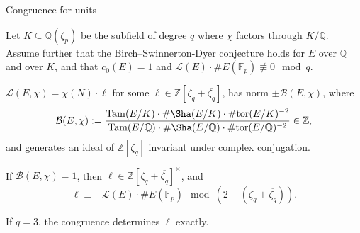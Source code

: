 \documentclass[10pt]{beamer}
\begin{document}
\begin{frame}[t]{Congruence for units}

Let $ K \subseteq \mathbb{Q}(\zeta_p) $ be the subfield of degree $ q $ where $ \chi $ factors through $ K / \mathbb{Q} $. \pause Assume further that the Birch--Swinnerton-Dyer conjecture holds for $ E $ over $ \mathbb{Q} $ and over $ K $, and that $ c_0(E) = 1 $ and $ \mathcal{L}(E) \cdot \#E(\mathbb{F}_p) \not\equiv 0 \mod q $.

\pause

\begin{theorem}
$ \mathcal{L}(E, \chi) = \overline{\chi}(N) \cdot \ell $ for some $ \ell \in \mathbb{Z}[\zeta_q + \overline{\zeta_q}] $, \pause has norm $ \pm\mathcal{B}(E, \chi) $, where
$$ \mathcal{B}(E, \chi) := \dfrac{\mathrm{Tam}(E / K) \cdot \#\Sha(E / K) \cdot \#\mathrm{tor}(E / K)^{-2}}{\mathrm{Tam}(E / \mathbb{Q}) \cdot \#\Sha(E / \mathbb{Q}) \cdot \#\mathrm{tor}(E / \mathbb{Q})^{-2}} \in \mathbb{Z}, $$
\pause and generates an ideal of $ \mathbb{Z}[\zeta_q] $ invariant under complex conjugation.
\end{theorem}

\pause

\begin{corollary}
If $ \mathcal{B}(E, \chi) = 1 $, then $ \ell \in \mathbb{Z}[\zeta_q + \overline{\zeta_q}]^\times $, and
$$ \ell \equiv -\mathcal{L}(E) \cdot \#E(\mathbb{F}_p) \mod (2 - (\zeta_q + \overline{\zeta_q})). $$
\end{corollary}

\pause If $ q = 3 $, the congruence determines $ \ell $ exactly.

\end{frame}
\end{document}
